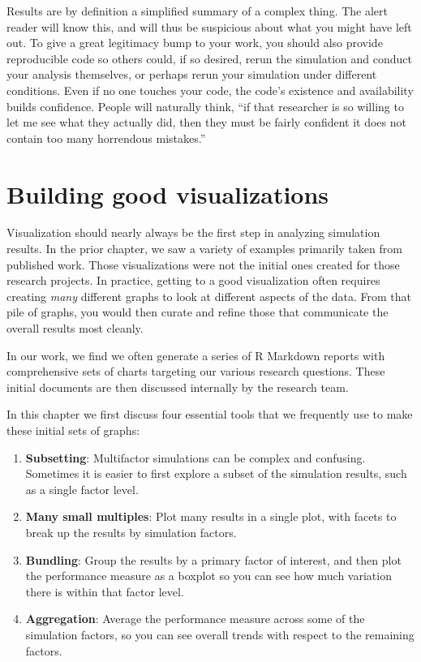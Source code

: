 \documentclass[
]{book}
\providecommand{\tightlist}{%
  \setlength{\itemsep}{0pt}\setlength{\parskip}{0pt}}
\begin{document}
Results are by definition a simplified summary of a complex thing.
The alert reader will know this, and will thus be suspicious about what you might have left out.
To give a great legitimacy bump to your work, you should also provide reproducible code so others could, if so desired, rerun the simulation and conduct your analysis themselves, or perhaps rerun your simulation under different conditions.
Even if no one touches your code, the code's existence and availability builds confidence.
People will naturally think, ``if that researcher is so willing to let me see what they actually did, then they must be fairly confident it does not contain too many horrendous mistakes.''

\chapter{Building good visualizations}\label{building-good-visualization}

Visualization should nearly always be the first step in analyzing simulation results.
In the prior chapter, we saw a variety of examples primarily taken from published work.
Those visualizations were not the initial ones created for those research projects.
In practice, getting to a good visualization often requires creating \emph{many} different graphs to look at different aspects of the data.
From that pile of graphs, you would then curate and refine those that communicate the overall results most cleanly.

In our work, we find we often generate a series of R Markdown reports with comprehensive sets of charts targeting our various research questions.
These initial documents are then discussed internally by the research team.

In this chapter we first discuss four essential tools that we frequently use to make these initial sets of graphs:

\begin{enumerate}
\def\labelenumi{\arabic{enumi}.}
\tightlist
\item
  \textbf{Subsetting}: Multifactor simulations can be complex and confusing. Sometimes it is easier to first explore a subset of the simulation results, such as a single factor level.
\item
  \textbf{Many small multiples}: Plot many results in a single plot, with facets to break up the results by simulation factors.
\item
  \textbf{Bundling}: Group the results by a primary factor of interest, and then plot the performance measure as a boxplot so you can see how much variation there is within that factor level.
\item
  \textbf{Aggregation}: Average the performance measure across some of the simulation factors, so you can see overall trends with respect to the remaining factors.
\end{enumerate}
\end{document}
